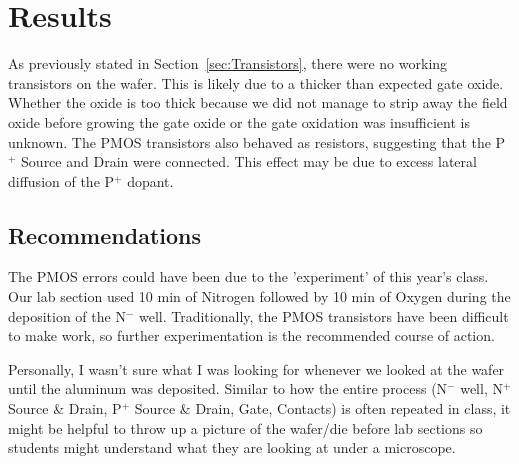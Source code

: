 \documentclass[letter,12pt]{article}
\begin{document}
\FloatBarrier
\section{Results}
	As previously stated in Section~\ref{sec:Transistors}, there were no working transistors on the wafer.  This is likely due to a thicker than expected gate oxide.  Whether the oxide is too thick because we did not manage to strip away the field oxide before growing the gate oxide or the gate oxidation was insufficient is unknown.  The PMOS transistors also behaved as resistors, suggesting that the P$^+$ Source and Drain were connected. This effect may be due to excess lateral diffusion of the P$^+$ dopant.
	
	\subsection{Recommendations}
		The PMOS errors could have been due to the 'experiment' of this year's class.  Our lab section used 10 min of Nitrogen followed by 10 min of Oxygen during the deposition of the N$^-$ well. Traditionally, the PMOS transistors have been difficult to make work, so further experimentation is the recommended course of action.
		
		Personally, I wasn't sure what I was looking for whenever we looked at the wafer until the aluminum was deposited.  Similar to how the entire process (N$^-$ well, N$^+$ Source \& Drain, P$^+$ Source \& Drain, Gate, Contacts) is often repeated in class, it might be helpful to throw up a picture of the wafer/die before lab sections so students might understand what they are looking at under a microscope.

\pagebreak
\printbibliography
\end{document}
